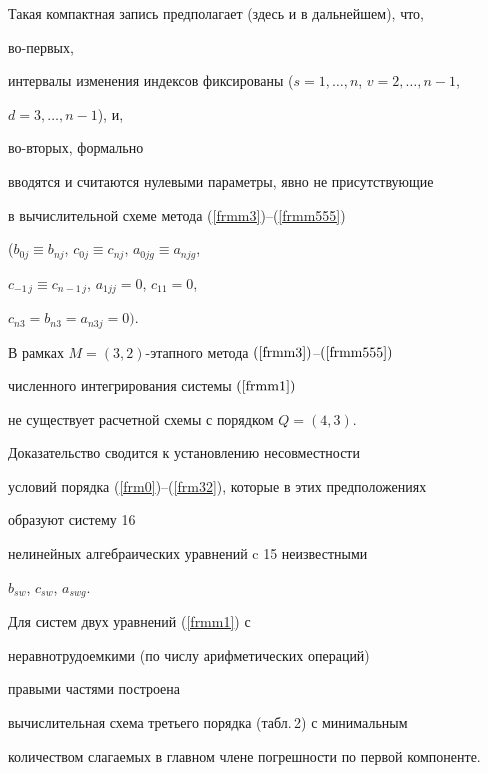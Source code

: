 Такая компактная запись предполагает (здесь и в дальнейшем), что,


во-первых,


интервалы изменения индексов фиксированы ($s=1,\dotsc,n$, $v=2,\dotsc,n-1$,


$d=3,\dotsc,n-1$), и,


во-вторых, формально 


вводятся и считаются нулевыми параметры, явно не присутствующие


в вычислительной схеме метода (\ref{frmm3})--(\ref{frmm555})


($b_{0j} \equiv b_{nj}$, $c_{0j} \equiv c_{nj}$, $a_{0jg} \equiv a_{njg}$,


$c_{-1\,j} \equiv c_{n-1\,j}$, $a_{1jj} =0$, $c_{11} =0$,


$c_{n3} =b_{n3} =a_{n3j} =0)$.





\begin{thm}


В рамках $M=(3,2)$-этапного метода $(\ref{frmm3})$--$(\ref{frmm555})$


численного интегрирования системы $(\ref{frmm1})$


не существует расчетной схемы с порядком $Q=(4,3)$.


\end{thm}





Доказательство сводится к установлению несовместности


условий порядка (\ref{frm0})--(\ref{frm32}), которые в этих предположениях 


образуют систему 16


нелинейных алгебраических уравнений c 15 неизвестными


$b_{sw}$, $c_{sw}$, $a_{swg}$.


Для систем двух уравнений (\ref{frmm1}) с


неравнотрудоемкими (по числу арифметических операций)


правыми частями построена 


вычислительная схема третьего порядка (табл.\,2) с минимальным


количеством слагаемых в главном члене погрешности по первой компоненте.




\pagebreak





